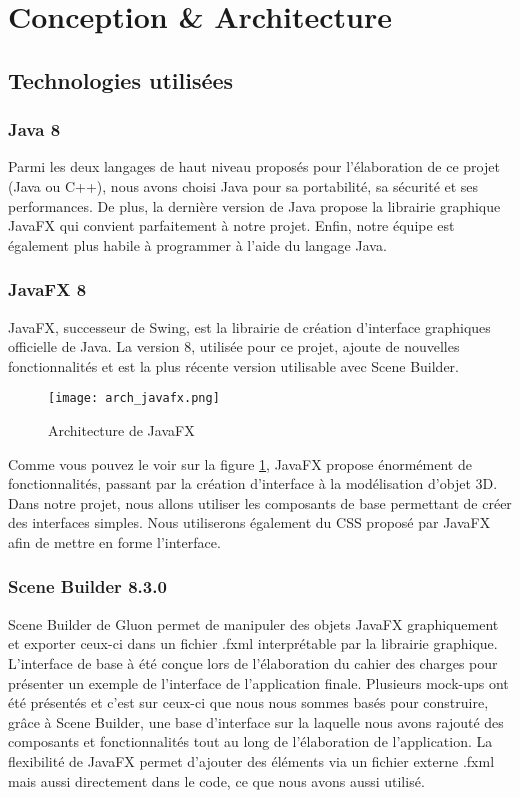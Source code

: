 \section{Conception \& Architecture}
\subsection{Technologies utilisées}
\subsubsection{Java 8}
Parmi les deux langages de haut niveau proposés pour l'élaboration de ce projet (Java ou C++), nous avons choisi Java pour sa portabilité, sa sécurité et ses performances. De plus, la dernière version de Java propose la librairie graphique JavaFX qui convient parfaitement à notre projet. Enfin, notre équipe est également plus habile à programmer à l'aide du langage Java.

\subsubsection{JavaFX 8}
JavaFX, successeur de Swing, est la librairie de création d'interface graphiques officielle de Java. La version 8, utilisée pour ce projet, ajoute de nouvelles fonctionnalités et est la plus récente version utilisable avec Scene Builder.

\begin{figure}[h]
    \caption{Architecture de JavaFX}
    \centering
    \texttt{[image: arch\_javafx.png]}
    \label{fig:arch_javafx}
\end{figure}

Comme vous pouvez le voir sur la figure \ref{fig:arch_javafx}, JavaFX propose énormément de fonctionnalités, passant par la création d'interface à la modélisation d'objet 3D. Dans notre projet, nous allons utiliser les composants de base permettant de créer des interfaces simples. Nous utiliserons également du CSS proposé par JavaFX afin de mettre en forme l'interface.

\subsubsection{Scene Builder 8.3.0}
Scene Builder de Gluon permet de manipuler des objets JavaFX graphiquement et exporter ceux-ci dans un fichier \og .fxml \fg{} interprétable par la librairie graphique. L'interface de base à été conçue lors de l'élaboration du cahier des charges pour présenter un exemple de l'interface de l'application finale. Plusieurs mock-ups ont été présentés et c'est sur ceux-ci que nous nous sommes basés pour construire, grâce à Scene Builder, une base d'interface sur la laquelle nous avons rajouté des composants et fonctionnalités tout au long de l'élaboration de l'application. La flexibilité de JavaFX permet d'ajouter des éléments via un fichier externe \og .fxml \fg{} mais aussi directement dans le code, ce que nous avons aussi utilisé.

